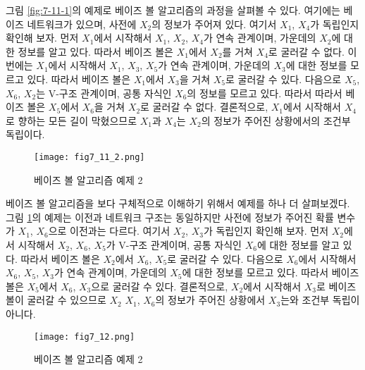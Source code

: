 \documentclass[a4paper]{oblivoir}
\begin{document}
그림 \ref{fig:7-11-1}의 예제로 베이즈 볼 알고리즘의 과정을 살펴볼 수 있다. 여기에는 베이즈 네트워크가 있으며, 사전에 $X_2$의 정보가 주어져 있다. 여기서 $X_1$, $X_4$가 독립인지 확인해 보자. 먼저 $X_1$에서 시작해서 $X_1$, $X_2$, $X_4$가 연속 관계이며, 가운데의 $X_2$에 대한 정보를 알고 있다. 따라서 베이즈 볼은 $X_1$에서 $X_2$를 거쳐 $X_4$로 굴러갈 수 없다. 이번에는 $X_1$에서 시작해서 $X_1$, $X_3$, $X_5$가 연속 관계이며, 가운데의 $X_3$에 대한 정보를 모르고 있다. 따라서 베이즈 볼은 $X_1$에서 $X_3$을 거쳐 $X_5$로 굴러갈 수 있다. 다음으로 $X_5$, $X_6$, $X_2$는 V-구조 관계이며, 공통 자식인 $X_6$의 정보를 모르고 있다. 따라서 따라서 베이즈 볼은 $X_5$에서 $X_6$을 거쳐 $X_2$로 굴러갈 수 없다. 결론적으로, $X_1$에서 시작해서 $X_4$로 향하는 모든 길이 막혔으므로 $X_1$과 $X_4$는 $X_2$의 정보가 주어진 상황에서의 조건부 독립이다. \\

\begin{figure}[ht] \centering 
\texttt{[image: fig7\_11\_2.png]} 
\caption{베이즈 볼 알고리즘 예제 2}
\label{fig:7-11-2}
\end{figure} 

베이즈 볼 알고리즘을 보다 구체적으로 이해하기 위해서 예제를 하나 더 살펴보겠다. 그림 \ref{fig:7-11-2}의 예제는 이전과 네트워크 구조는 동일하지만 사전에 정보가 주어진 확률 변수가 $X_1$, $X_6$으로 이전과는 다르다. 여기서 $X_2$, $X_3$가 독립인지 확인해 보자. 먼저 $X_2$에서 시작해서 $X_2$, $X_6$, $X_5$가 V-구조 관계이며, 공통 자식인 $X_6$에 대한 정보를 알고 있다. 따라서 베이즈 볼은 $X_2$에서 $X_6$, $X_5$로 굴러갈 수 있다. 다음으로 $X_6$에서 시작해서 $X_6$, $X_5$, $X_3$가 연속 관계이며, 가운데의 $X_5$에 대한 정보를 모르고 있다. 따라서 베이즈 볼은 $X_5$에서 $X_6$, $X_3$으로 굴러갈 수 있다. 결론적으로, $X_2$에서 시작해서 $X_3$로 베이즈 볼이 굴러갈 수 있으므로 $X_2$ $X_1$, $X_6$의 정보가 주어진 상황에서 $X_3$는와 조건부 독립이 아니다. \\

\begin{figure}[ht] \centering 
\texttt{[image: fig7\_12.png]} 
\caption{베이즈 볼 알고리즘 예제 2}
\label{fig:7-12}
\end{figure} 
\end{document}
